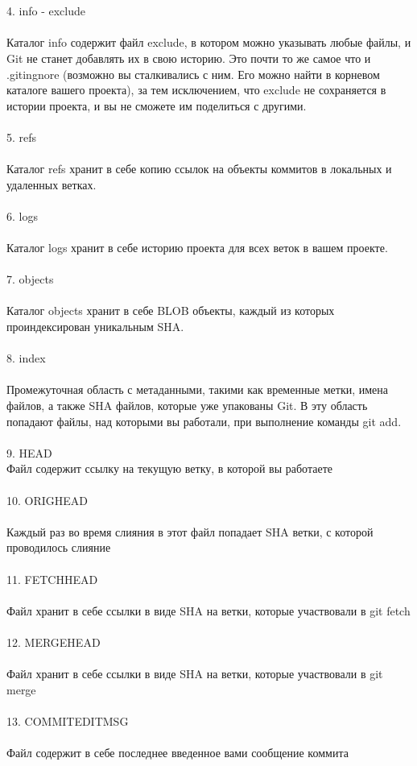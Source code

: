 \documentclass{article}
\begin{document}
\\ \\
4. info - exclude
\\ \\
Каталог info содержит файл exclude, в котором можно указывать любые файлы, и Git не станет добавлять их в свою историю. Это почти то же самое что и .gitingnore (возможно вы сталкивались с ним. Его можно найти в корневом каталоге вашего проекта), за тем исключением, что exclude не сохраняется в истории проекта, и вы не сможете им поделиться с другими.
\\ \\
5. refs
\\ \\
Каталог refs хранит в себе копию ссылок на объекты коммитов в локальных и удаленных ветках.
\\ \\
6. logs
\\ \\
Каталог logs хранит в себе историю проекта для всех веток в вашем проекте.
\\ \\
7. objects
\\ \\
Каталог objects хранит в себе BLOB объекты, каждый из которых проиндексирован уникальным SHA.
\\ \\
8. index
\\ \\
Промежуточная область с метаданными, такими как временные метки, имена файлов, а также SHA файлов, которые уже упакованы Git. В эту область попадают файлы, над которыми вы работали, при выполнение команды git add.
\\ \\
9. HEAD
\\
Файл содержит ссылку на текущую ветку, в которой вы работаете
\\ \\
10. ORIGHEAD
\\ \\
Каждый раз во время слияния в этот файл попадает SHA ветки, с которой проводилось слияние
\\ \\
11. FETCHHEAD
\\ \\
Файл хранит в себе ссылки в виде SHA на ветки, которые участвовали в git fetch
\\ \\
12. MERGEHEAD
\\ \\
Файл хранит в себе ссылки в виде SHA на ветки, которые участвовали в git merge
\\ \\
13. COMMITEDITMSG
\\ \\
Файл содержит в себе последнее введенное вами сообщение коммита
\end{document}
